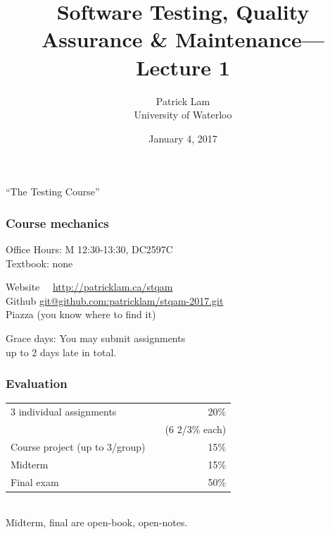 \documentclass{beamer}
\title{Software Testing, Quality Assurance \& Maintenance---Lecture 1}
\author{Patrick Lam\\University of Waterloo}
\date{January 4, 2017}
\newenvironment{changemargin}[1]{%
  \begin{list}{}{%
    \setlength{\topsep}{0pt}%
    \setlength{\leftmargin}{#1}%
    \setlength{\rightmargin}{1em}
    \setlength{\listparindent}{\parindent}%
    \setlength{\itemindent}{\parindent}%
    \setlength{\parsep}{\parskip}%
  }%
  \item[]}{\end{list}}
\begin{document}
\begin{frame}
  \titlepage
\end{frame}

\begin{frame}
  \begin{center}
  \Huge ``The Testing Course''
  \end{center}
\end{frame}

\begin{frame}
\frametitle{Course mechanics}

\Large

\begin{changemargin}{1em}
  Office Hours: M 12:30-13:30, DC2597C\\[1em]
  
  Textbook: none\\[1em]

{\small
  \begin{tabbing}
Website~~ \= \url{http://patricklam.ca/stqam}\\[1em]
Github \> \url{git@github.com:patricklam/stqam-2017.git}\\[1em]
Piazza \> (you know where to find it)
  \end{tabbing}
}

  Grace days: You may submit assignments \\ up to 2 days late in total.
\end{changemargin}

\end{frame}

\begin{frame}
  \frametitle{Evaluation}
  \Large
\begin{changemargin}{1em}
\begin{tabular}{lr}
3 individual assignments & 20\% \\
& ~~(6 2/3\% each) \\
Course project (up to 3/group) & 15\% \\
Midterm & 15\% \\
Final exam & 50\% \\
\end{tabular}~\\[1em]

Midterm, final are open-book, open-notes.\\[1em]

\end{changemargin}

\end{frame}
\end{document}
